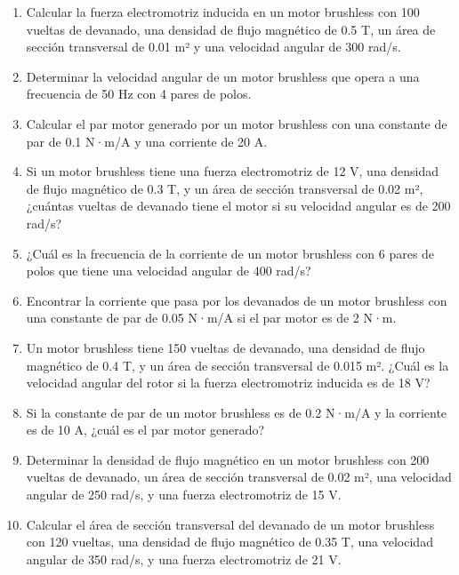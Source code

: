 \documentclass[../main]{subfiles}
\begin{document}
\begin{enumerate}
    \item Calcular la fuerza electromotriz inducida en un motor brushless con 100 vueltas de devanado, una densidad de flujo magnético de 0.5 T, un área de sección transversal de 0.01 m² y una velocidad angular de 300 rad/s.
    \item Determinar la velocidad angular de un motor brushless que opera a una frecuencia de 50 Hz con 4 pares de polos.
    \item Calcular el par motor generado por un motor brushless con una constante de par de 0.1 N·m/A y una corriente de 20 A.
    \item Si un motor brushless tiene una fuerza electromotriz de 12 V, una densidad de flujo magnético de 0.3 T, y un área de sección transversal de 0.02 m², ¿cuántas vueltas de devanado tiene el motor si su velocidad angular es de 200 rad/s?
    \item ¿Cuál es la frecuencia de la corriente de un motor brushless con 6 pares de polos que tiene una velocidad angular de 400 rad/s?
    \item Encontrar la corriente que pasa por los devanados de un motor brushless con una constante de par de 0.05 N·m/A si el par motor es de 2 N·m.
    \item Un motor brushless tiene 150 vueltas de devanado, una densidad de flujo magnético de 0.4 T, y un área de sección transversal de 0.015 m². ¿Cuál es la velocidad angular del rotor si la fuerza electromotriz inducida es de 18 V?
    \item Si la constante de par de un motor brushless es de 0.2 N·m/A y la corriente es de 10 A, ¿cuál es el par motor generado?
    \item Determinar la densidad de flujo magnético en un motor brushless con 200 vueltas de devanado, un área de sección transversal de 0.02 m², una velocidad angular de 250 rad/s, y una fuerza electromotriz de 15 V.
    \item Calcular el área de sección transversal del devanado de un motor brushless con 120 vueltas, una densidad de flujo magnético de 0.35 T, una velocidad angular de 350 rad/s, y una fuerza electromotriz de 21 V.
\end{enumerate}
\end{document}
